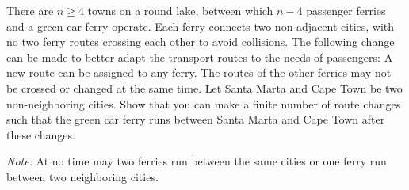There are $n\geq 4$ towns on a round lake, between which $n-4$ passenger ferries and a
green car ferry operate. Each ferry connects two non-adjacent cities, with no two ferry routes
crossing each other to avoid collisions. The following change can be made to better adapt the
transport routes to the needs of passengers: A new route can be assigned to any ferry.
The routes of the other ferries may not be crossed or changed at the same time.
Let Santa Marta and Cape Town be two non-neighboring cities.
Show that you can make a finite number of route changes such that the green car ferry
runs between Santa Marta and Cape Town after these changes.

\emph{Note:} At no time may two ferries run between the same
cities or one ferry run between two neighboring cities.
